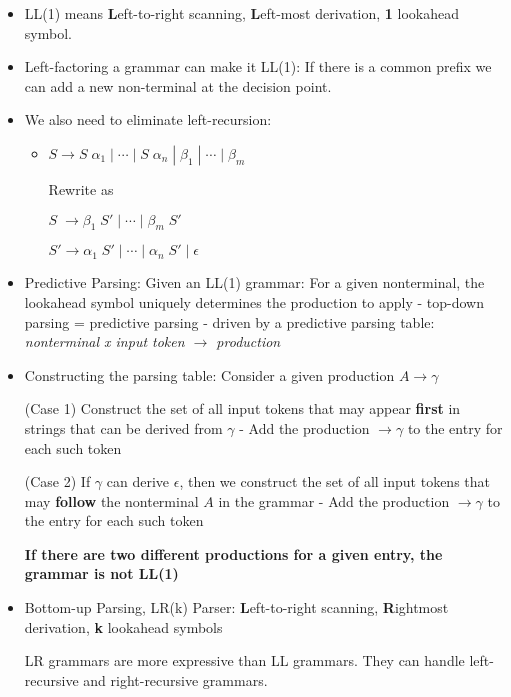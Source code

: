 \begin{itemize}
\begin{itemize}
		\item LL(1) means \textbf{L}eft-to-right scanning, \textbf{L}eft-most derivation, \textbf{1} lookahead symbol.
		
		\item Left-factoring a grammar can make it LL(1): If there is a common prefix we can add a new non-terminal at the decision point.
		
		\item We also need to eliminate left-recursion: 
		\begin{itemize}
			\item $S \rightarrow S\; \alpha_1 \;|\; \cdots \;|\; S\; \alpha _n \;|\; \beta _1 \;|\; \cdots \;|\; \beta_m$
			
			Rewrite as
			
			$S\; \rightarrow \beta _1\; S' \;|\; \cdots \;|\; \beta _m\; S'$
			
			$S' \rightarrow \alpha_1\; S' \;|\;  \cdots \;|\; \alpha_n\; S' \;|\; \epsilon$ 
		\end{itemize}
	
		\item Predictive Parsing: Given an LL(1) grammar: For a given nonterminal, the lookahead symbol uniquely determines the production to apply - top-down parsing = predictive parsing - driven by a predictive parsing table: \textit{nonterminal x input token $\rightarrow$ production}
		
		\item Constructing the parsing table: 
		Consider a given production $A \rightarrow \gamma$
		
		(Case 1) Construct the set of all input tokens that may appear \textbf{first} in strings that can be derived from $\gamma$ - Add the production $\rightarrow \gamma$ to the entry for each such token
		
		(Case 2) If $\gamma$ can derive $\epsilon$, then we construct the set of all input tokens that may \textbf{follow} the nonterminal $A$ in the grammar - Add the production $\rightarrow \gamma$ to the entry for each such token
		
		\textbf{If there are two different productions for a given entry, the grammar is not LL(1)}
		
		\item Bottom-up Parsing, LR(k) Parser: \textbf{L}eft-to-right scanning, \textbf{R}ightmost derivation, \textbf{k} lookahead symbols
		
		LR grammars are more expressive than LL grammars. They can handle left-recursive and right-recursive grammars.
		

\end{itemize}
\end{itemize}
